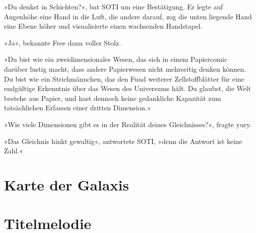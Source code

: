 »Du denkst in Schichten?«, bat SOTI um eine Bestätigung. Er legte auf Augenhöhe eine Hand in die Luft, die andere darauf, zog die unten liegende Hand eine Ebene höher und visualisierte einen wachsenden Handstapel.

»Ja«, bekannte Free dann voller Stolz.

»Du bist wie ein zweidimensionales Wesen, das sich in einem Papiercomic darüber lustig macht, dass andere Papierwesen nicht mehrseitig denken können. Du bist wie ein Strichmännchen, das den Fund weiterer Zellstoffblätter für eine endgültige Erkenntnis über das Wesen des Universums hält. Du glaubst, die Welt bestehe aus Papier, und hast dennoch keine gedankliche Kapazität zum tatsächlichen Erfassen einer dritten Dimension.«

»Wie viele Dimensionen gibt es in der Realität deines Gleichnisses?«, fragte yury.

»Das Gleichnis hinkt gewaltig«, antwortete SOTI, »denn die Antwort ist keine Zahl.«


\chapter{Karte der Galaxis}

\cleardoubleevenpage






\chapter{Titelmelodie}

